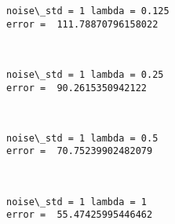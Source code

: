 \documentclass[11pt]{article}
\begin{document}
    \begin{Verbatim}[commandchars=\\\{\}]
noise\_std = 1 lambda = 0.125
error =  111.78870796158022

    \end{Verbatim}

    \begin{center}
    \end{center}
    { \hspace*{\fill} \\}
    
    \begin{Verbatim}[commandchars=\\\{\}]
noise\_std = 1 lambda = 0.25
error =  90.2615350942122

    \end{Verbatim}

    \begin{center}
    \end{center}
    { \hspace*{\fill} \\}
    
    \begin{Verbatim}[commandchars=\\\{\}]
noise\_std = 1 lambda = 0.5
error =  70.75239902482079

    \end{Verbatim}

    \begin{center}
    \end{center}
    { \hspace*{\fill} \\}
    
    \begin{Verbatim}[commandchars=\\\{\}]
noise\_std = 1 lambda = 1
error =  55.47425995446462

    \end{Verbatim}

    \begin{center}
    \end{center}
    { \hspace*{\fill} \\}
    
\end{document}
